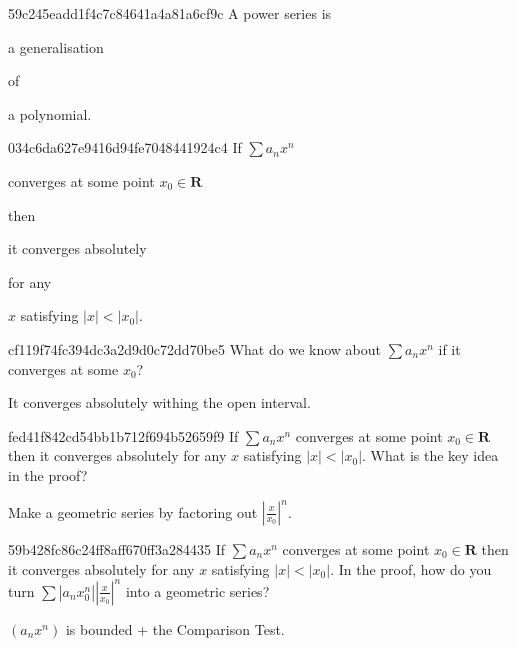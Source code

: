 \begin{note}{59c245eadd1f4c7c84641a4a81a6cf9c}
    A power series is \begin{icloze}{2}a generalisation\end{icloze} of \begin{icloze}{1}a polynomial.\end{icloze}
\end{note}

\begin{note}{034c6da627e9416d94fe7048441924c4}
    If \({ \sum a_n x^{n} }\) \begin{icloze}{2}converges at some point \({ x_0 \in \mathbf{R} }\)\end{icloze} then \begin{icloze}{1}it converges absolutely\end{icloze} for any \begin{icloze}{3}\({ x }\) satisfying \({ \left\lvert x \right\rvert < \left\lvert x_0 \right\rvert }\).\end{icloze}
\end{note}

\begin{note}{cf119f74fc394dc3a2d9d0c72dd70be5}
    What do we know about \({ \sum a_n x^{n} }\) if it converges at some \({ x_0 }\)?

    \begin{cloze}{1}
        It converges absolutely withing the open interval.
    \end{cloze}
\end{note}

\begin{note}{fed41f842cd54bb1b712f694b52659f9}
    If \({ \sum a_n x^{n} }\) converges at some point \({ x_0 \in \mathbf{R} }\) then it converges absolutely for any \({ x }\) satisfying \({ \left\lvert x \right\rvert < \left\lvert x_0 \right\rvert }\).
    What is the key idea in the proof?

    \begin{cloze}{1}
        Make a geometric series by factoring out \({ \left\lvert \frac{x}{x_0} \right\rvert^{n} }\).
    \end{cloze}
\end{note}

\begin{note}{59b428fc86c24ff8aff670ff3a284435}
    If \({ \sum a_n x^{n} }\) converges at some point \({ x_0 \in \mathbf{R} }\) then it converges absolutely for any \({ x }\) satisfying \({ \left\lvert x \right\rvert < \left\lvert x_0 \right\rvert }\).
    In the proof, how do you turn \({ \sum \left\lvert a_n x_0^{n} \right\rvert \left\lvert \frac{x}{x_0} \right\rvert^{n} }\) into a geometric series?

    \begin{cloze}{1}
        \({ (a_n x^{n}) }\) is bounded + the Comparison Test.
    \end{cloze}
\end{note}

